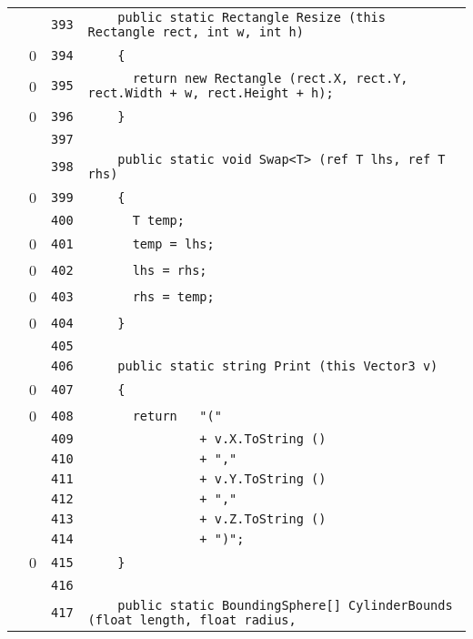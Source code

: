 \documentclass[a4paper,10pt]{article}
\begin{document}
\begin{longtable}[l]{lrrl}
\cellcolor{gray} &  & \verb~393~ & \verb~    public static Rectangle Resize (this Rectangle rect, int w, int h)~\\
\cellcolor{red} & 0 & \verb~394~ & \verb~    {~\\
\cellcolor{red} & 0 & \verb~395~ & \verb~      return new Rectangle (rect.X, rect.Y, rect.Width + w, rect.Height + h);~\\
\cellcolor{red} & 0 & \verb~396~ & \verb~    }~\\
\cellcolor{gray} &  & \verb~397~ & \verb~~\\
\cellcolor{gray} &  & \verb~398~ & \verb~    public static void Swap<T> (ref T lhs, ref T rhs)~\\
\cellcolor{red} & 0 & \verb~399~ & \verb~    {~\\
\cellcolor{gray} &  & \verb~400~ & \verb~      T temp;~\\
\cellcolor{red} & 0 & \verb~401~ & \verb~      temp = lhs;~\\
\cellcolor{red} & 0 & \verb~402~ & \verb~      lhs = rhs;~\\
\cellcolor{red} & 0 & \verb~403~ & \verb~      rhs = temp;~\\
\cellcolor{red} & 0 & \verb~404~ & \verb~    }~\\
\cellcolor{gray} &  & \verb~405~ & \verb~~\\
\cellcolor{gray} &  & \verb~406~ & \verb~    public static string Print (this Vector3 v)~\\
\cellcolor{red} & 0 & \verb~407~ & \verb~    {~\\
\cellcolor{red} & 0 & \verb~408~ & \verb~      return   "("~\\
\cellcolor{gray} &  & \verb~409~ & \verb~               + v.X.ToString ()~\\
\cellcolor{gray} &  & \verb~410~ & \verb~               + ","~\\
\cellcolor{gray} &  & \verb~411~ & \verb~               + v.Y.ToString ()~\\
\cellcolor{gray} &  & \verb~412~ & \verb~               + ","~\\
\cellcolor{gray} &  & \verb~413~ & \verb~               + v.Z.ToString ()~\\
\cellcolor{gray} &  & \verb~414~ & \verb~               + ")";~\\
\cellcolor{red} & 0 & \verb~415~ & \verb~    }~\\
\cellcolor{gray} &  & \verb~416~ & \verb~~\\
\cellcolor{gray} &  & \verb~417~ & \verb~    public static BoundingSphere[] CylinderBounds (float length, float radius,~\\

\end{longtable}
\end{document}
